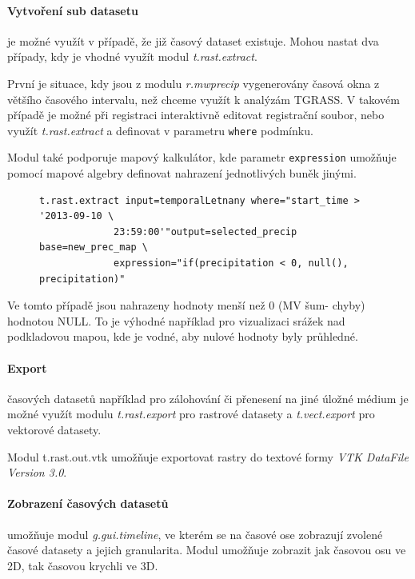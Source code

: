 \documentclass[a4paper,12pt,oneside]{report}
\begin{document}
\paragraph*{Vytvoření sub datasetu} je možné využít v případě, že již časový dataset existuje. Mohou nastat dva případy, kdy je vhodné využít modul \textit{t.rast.extract}. 

První je situace, kdy jsou z modulu \textit{r.mwprecip} vygenerovány časová okna z většího časového intervalu, než chceme využít k analýzám TGRASS. V takovém případě je možné při registraci interaktivně editovat registrační soubor, nebo využít \textit{t.rast.extract} a definovat v parametru \texttt{where} podmínku.

Modul také podporuje mapový kalkulátor, kde parametr \texttt{expression} umožňuje pomocí mapové algebry definovat nahrazení jednotlivých buněk jinými. 
\begin{figure}[h!]
\begin{footnotesize}
\lstset{extendedchars=false,
escapeinside=''}
\begin{lstlisting}[style=mybash]
t.rast.extract input=temporalLetnany where="start_time > '2013-09-10 \
             23:59:00'"output=selected_precip base=new_prec_map \
             expression="if(precipitation < 0, null(), precipitation)" 
\end{lstlisting}
\end{footnotesize} 
\end{figure}
Ve tomto případě  jsou nahrazeny hodnoty menší než 0 (MV šum- chyby) hodnotou NULL. To je výhodné například pro vizualizaci srážek nad podkladovou mapou, kde je vodné, aby nulové hodnoty byly průhledné.

\paragraph*{Export} časových datasetů například pro zálohování či přenesení na jiné úložné médium je  možné využít modulu \textit{t.rast.export} pro rastrové datasety a \textit{t.vect.export} pro vektorové datasety.

Modul {t.rast.out.vtk} umožňuje exportovat rastry do textové formy \textit{VTK DataFile Version 3.0}. 

\paragraph*{Zobrazení časových datasetů } umožňuje modul \emph{g.gui.timeline}, ve kterém se na časové ose zobrazují zvolené časové datasety a jejich granularita. Modul umožňuje zobrazit jak časovou osu ve 2D, tak časovou krychli ve 3D.
\end{document}
